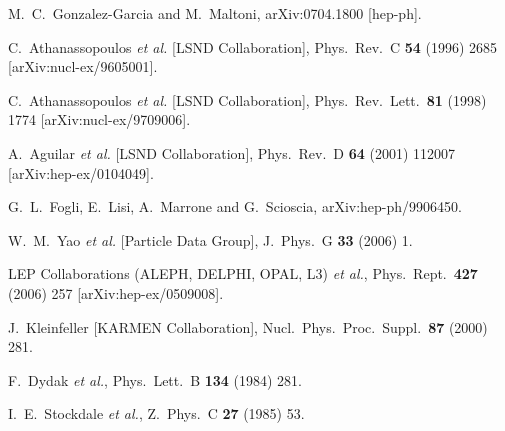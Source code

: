 \documentclass[12pt]{elsart}
\begin{document}
\begin{thebibliography}{99}
  M.~C.~Gonzalez-Garcia and M.~Maltoni,
  arXiv:0704.1800 [hep-ph].

  C.~Athanassopoulos {\it et al.}  [LSND Collaboration],
  Phys.\ Rev.\  C {\bf 54} (1996) 2685
  [arXiv:nucl-ex/9605001].

  C.~Athanassopoulos {\it et al.}  [LSND Collaboration],
  Phys.\ Rev.\ Lett.\  {\bf 81} (1998) 1774
  [arXiv:nucl-ex/9709006].

  A.~Aguilar {\it et al.}  [LSND Collaboration],
  Phys.\ Rev.\  D {\bf 64} (2001) 112007
  [arXiv:hep-ex/0104049].

  G.~L.~Fogli, E.~Lisi, A.~Marrone and G.~Scioscia,
  arXiv:hep-ph/9906450.

  W.~M.~Yao {\it et al.}  [Particle Data Group],
  J.\ Phys.\ G {\bf 33} (2006) 1.

  LEP Collaborations (ALEPH, DELPHI, OPAL, L3) {\it et al.},
  Phys.\ Rept.\  {\bf 427} (2006) 257
  [arXiv:hep-ex/0509008].

  J.~Kleinfeller  [KARMEN Collaboration],
  Nucl.\ Phys.\ Proc.\ Suppl.\  {\bf 87} (2000) 281.

  F.~Dydak {\it et al.},
  Phys.\ Lett.\  B {\bf 134} (1984) 281.

  I.~E.~Stockdale {\it et al.},
  Z.\ Phys.\  C {\bf 27} (1985) 53.


\end{thebibliography}
\end{document}
